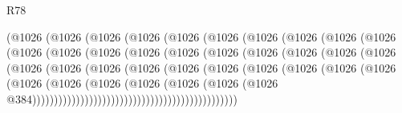 \begin{lexlean}{R78}
\begin{coremodule}
                        (@1026
                          (@1026
                            (@1026
                              (@1026
                                (@1026
                                  (@1026
                                    (@1026
                                      (@1026
                                        (@1026
                                          (@1026
                                            (@1026
                                              (@1026
                                                (@1026
                                                  (@1026
                                                    (@1026
                                                      (@1026
                                                        (@1026
                                                          (@1026
                                                            (@1026
                                                              (@1026
                                                                (@1026
                                                                  (@1026
                                                                    (@1026
                                                                      (@1026
                                                                        (@1026
                                                                          (@1026
                                                                            (@1026
                                                                              (@1026
                                                                                (@1026
                                                                                  (@1026
                                                                                    (@1026
                                                                                      (@1026
                                                                                        (@1026
                                                                                          (@1026
                                                                                            (@1026
                                                                                              (@1026
                                                                                                (@1026
                                                                                                  @384)))))))))))))))))))))))))))))))))))))))))))))))

\end{coremodule}
\end{lexlean}
